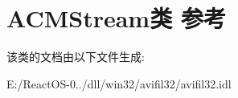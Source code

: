 \hypertarget{class_a_c_m_stream}{}\section{A\+C\+M\+Stream类 参考}
\label{class_a_c_m_stream}


该类的文档由以下文件生成\+:\begin{DoxyCompactItemize}
\item 
E\+:/\+React\+O\+S-\/0../dll/win32/avifil32/avifil32.\+idl\end{DoxyCompactItemize}
